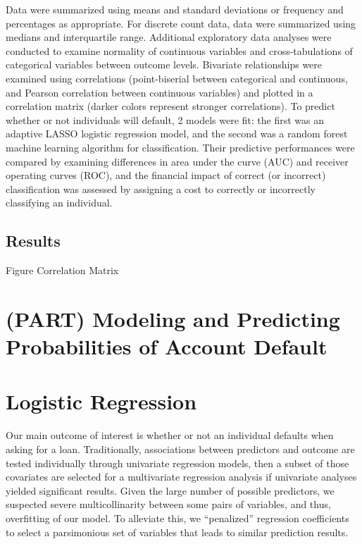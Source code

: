 \documentclass[
]{article}
\begin{document}
Data were summarized using means and standard deviations or frequency and percentages as appropriate. For discrete count data, data were summarized using medians and interquartile range. Additional exploratory data analyses were conducted to examine normality of continuous variables and cross-tabulations of categorical variables between outcome levels. Bivariate relationships were examined using correlations (point-biserial between categorical and continuous, and Pearson correlation between continuous variables) and plotted in a correlation matrix (darker colors represent stronger correlations). To predict whether or not individuals will default, 2 models were fit: the first was an adaptive LASSO logistic regression model, and the second was a random forest machine learning algorithm for classification. Their predictive performances were compared by examining differences in area under the curve (AUC) and receiver operating curves (ROC), and the financial impact of correct (or incorrect) classification was assessed by assigning a cost to correctly or incorrectly classifying an individual.

\hypertarget{results}{%
\subsection{Results}\label{results}}

Figure Correlation Matrix

\newpage

\hypertarget{part-modeling-and-predicting-probabilities-of-account-default}{%
\section{(PART) Modeling and Predicting Probabilities of Account Default}\label{part-modeling-and-predicting-probabilities-of-account-default}}

\hypertarget{logistic-regression}{%
\section{Logistic Regression}\label{logistic-regression}}

Our main outcome of interest is whether or not an individual defaults when asking for a loan. Traditionally, associations between predictors and outcome are tested individually through univariate regression models, then a subset of those covariates are selected for a multivariate regression analysis if univariate analyses yielded significant results. Given the large number of possible predictors, we suspected severe multicollinarity between some pairs of variables, and thus, overfitting of our model. To alleviate this, we ``penalized'' regression coefficients to select a parsimonious set of variables that leads to similar prediction results.
\end{document}
